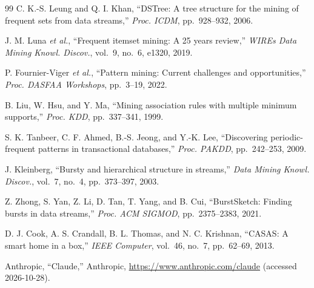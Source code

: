 \documentclass[10pt,twocolumn]{AROB}
\begin{document}
\begin{thebibliography}{99}
C. K.-S. Leung and Q. I. Khan,
``DSTree: A tree structure for the mining of frequent sets from data streams,''
{\it Proc. ICDM}, pp.~928--932, 2006.

J. M. Luna {\it et al.},
``Frequent itemset mining: A 25 years review,''
{\it WIREs Data Mining Knowl. Discov.}, vol.~9, no.~6, e1320, 2019.

P. Fournier-Viger {\it et al.},
``Pattern mining: Current challenges and opportunities,''
{\it Proc. DASFAA Workshops}, pp.~3--19, 2022.

B. Liu, W. Hsu, and Y. Ma,
``Mining association rules with multiple minimum supports,''
{\it Proc. KDD}, pp.~337--341, 1999.

S. K. Tanbeer, C. F. Ahmed, B.-S. Jeong, and Y.-K. Lee,
``Discovering periodic-frequent patterns in transactional databases,''
{\it Proc. PAKDD}, pp.~242--253, 2009.

J. Kleinberg,
``Bursty and hierarchical structure in streams,''
{\it Data Mining Knowl. Discov.}, vol.~7, no.~4, pp.~373--397, 2003.

Z. Zhong, S. Yan, Z. Li, D. Tan, T. Yang, and B. Cui,
``BurstSketch: Finding bursts in data streams,''
{\it Proc. ACM SIGMOD}, pp.~2375--2383, 2021.

D. J. Cook, A. S. Crandall, B. L. Thomas, and N. C. Krishnan,
``CASAS: A smart home in a box,''
{\it IEEE Computer}, vol.~46, no.~7, pp.~62--69, 2013.

Anthropic,
``Claude,'' Anthropic, \url{https://www.anthropic.com/claude} (accessed 2026-10-28).

\end{thebibliography}


\end{document}

